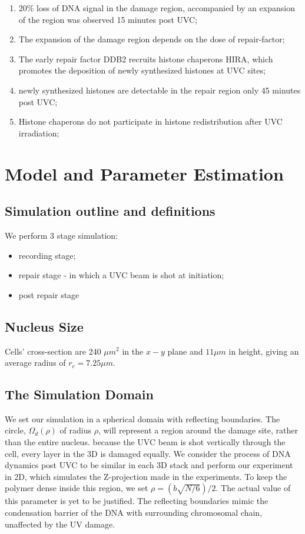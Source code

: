 \documentclass[12pt]{report}
\begin{document}
\begin{enumerate}
		\item 20\% loss of DNA signal in the damage region, accompanied by an expansion of the region was observed 15 minutes post UVC;
		\item The expansion of the damage region depends on the dose of repair-factor;		
		\item The early repair factor DDB2 recruits histone chaperons HIRA, which promotes the deposition of newly synthesized histones at UVC sites;
		\item newly synthesized histones are detectable in the repair region only 45 minutes post UVC;
		\item Histone chaperons do not participate in histone redistribution after UVC irradiation;
		
	\end{enumerate}
	
	
	\section{Model and Parameter Estimation}

	\subsection{Simulation outline and definitions}
	We perform 3 stage simulation: 
	\begin{itemize}
		\itemsep0em
		\item recording stage;
		\item repair stage - in which a UVC beam is shot at initiation;
		\item post repair stage
    \end{itemize}
    
	\subsection{Nucleus Size}
	 Cells' cross-section are 240 $\mu m^2$ in the $x-y$ plane and $11 \mu m$ in height, giving an average radius of $r_c=7.25 \mu m$.  
		
	\subsection{The Simulation Domain}
	We set our simulation in a spherical domain with reflecting boundaries. The circle, $\Omega_d(\rho)$ of radius $\rho$, will represent a region around the damage site, rather than the entire nucleus. 
	because the UVC beam is shot vertically through the cell, every layer in the 3D is damaged equally. We consider the process of DNA dynamics post UVC to be similar in each 3D stack and perform our experiment in 2D, which simulates the Z-projection made in the experiments.
	To keep the polymer dense inside this region, we set $\rho=(b\sqrt{N/6})/2$. The actual value of this parameter is yet to be justified. The reflecting boundaries mimic the condensation barrier of the DNA with surrounding chromosomal chain, unaffected by the UV damage. 
\end{document}
